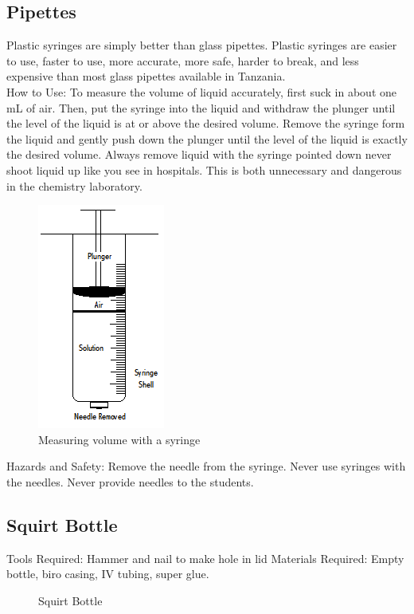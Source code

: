 \subsection*{Pipettes}
Plastic syringes are simply better than glass pipettes. Plastic syringes are easier to use, faster to use, more accurate, more safe, harder to break, and less expensive than most glass pipettes available in Tanzania.\\
How to Use: To measure the volume of liquid accurately, first suck in about one mL of air. Then, put the syringe into the liquid and withdraw the plunger until the level of the liquid is at or above the desired volume. Remove the syringe form the liquid and gently push down the plunger until the level of the liquid is exactly the desired volume. Always remove liquid with the syringe pointed down never shoot liquid up like you see in hospitals. This is both unnecessary and dangerous in the chemistry laboratory.
\begin{figure}[h]
\begin{center}
\includegraphics[scale=0.8]{img/syringe.png}
\caption{Measuring volume with a syringe}
\end{center}
\end{figure}

Hazards and Safety: Remove the needle from the syringe. Never use syringes with the needles. Never provide needles to the students.

\subsection*{Squirt Bottle}
Tools Required: Hammer and nail to make hole in lid
Materials Required: Empty bottle, biro casing, IV tubing, super glue.

\begin{figure}[h]
\begin{center}
\def\svgwidth{50pt}

\caption{Squirt Bottle}
\end{center}
\end{figure}

